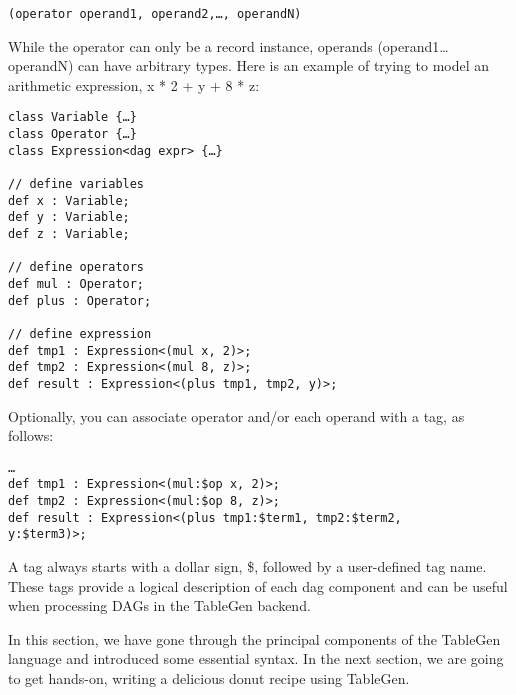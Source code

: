\begin{lstlisting}[style=styleCXX]
(operator operand1, operand2,…, operandN)
\end{lstlisting}

While the operator can only be a record instance, operands (operand1…operandN) can have arbitrary types. Here is an example of trying to model an arithmetic expression, x * 2 + y + 8 * z:

\begin{lstlisting}[style=styleCXX]
class Variable {…}
class Operator {…}
class Expression<dag expr> {…}

// define variables
def x : Variable;
def y : Variable;
def z : Variable;

// define operators
def mul : Operator;
def plus : Operator;

// define expression
def tmp1 : Expression<(mul x, 2)>;
def tmp2 : Expression<(mul 8, z)>;
def result : Expression<(plus tmp1, tmp2, y)>;
\end{lstlisting}

Optionally, you can associate operator and/or each operand with a tag, as follows:

\begin{lstlisting}[style=styleCXX]
…
def tmp1 : Expression<(mul:$op x, 2)>;
def tmp2 : Expression<(mul:$op 8, z)>;
def result : Expression<(plus tmp1:$term1, tmp2:$term2,
y:$term3)>;
\end{lstlisting}

A tag always starts with a dollar sign, \$, followed by a user-defined tag name. These tags provide a logical description of each dag component and can be useful when processing DAGs in the TableGen backend.

In this section, we have gone through the principal components of the TableGen language and introduced some essential syntax. In the next section, we are going to get hands-on, writing a delicious donut recipe using TableGen.

















